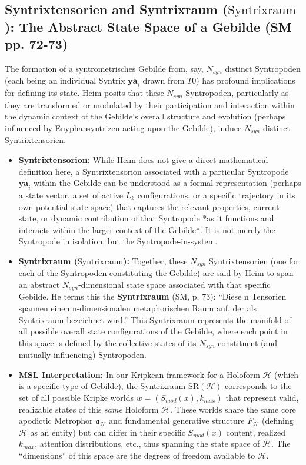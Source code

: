 \documentclass[
    12pt,              %
    a4paper,           %
    headings=normal,   %
    twoside=true,      %
    BCOR=8mm,          %
]{scrbook}
\newcommand{\q}[1]{\enquote{#1}}
\newcommand{\syntrix}{\bm{y\widetilde{a}}}
\newcommand{\syntrixtotalitaet}{T0}
\newcommand{\syntrixraum}{\text{Syntrixraum}}
\begin{document}
\subsection{Syntrixtensorien and Syntrixraum (\(\syntrixraum\)): The Abstract State Space of a Gebilde (SM pp. 72-73)}
\label{sec:ch4_syntrixtensorien_syntrixraum_revised_2} 

The formation of a syntrometrisches Gebilde from, say, \(N_{syn}\) distinct Syntropoden (each being an individual Syntrix \(\syntrix_i\) drawn from \(\syntrixtotalitaet\)) has profound implications for defining its state. Heim posits that these \(N_{syn}\) Syntropoden, particularly as they are transformed or modulated by their participation and interaction within the dynamic context of the Gebilde’s overall structure and evolution (perhaps influenced by Enyphansyntrizen acting upon the Gebilde), induce \(N_{syn}\) distinct Syntrixtensorien.

\begin{itemize}
    \item   \textbf{Syntrixtensorion:} While Heim does not give a direct mathematical definition here, a Syntrixtensorion associated with a particular Syntropode \(\syntrix_i\) within the Gebilde can be understood as a formal representation (perhaps a state vector, a set of active \(L_k\) configurations, or a specific trajectory in its own potential state space) that captures the relevant properties, current state, or dynamic contribution of that Syntropode *as it functions and interacts within the larger context of the Gebilde*. It is not merely the Syntropode in isolation, but the Syntropode-in-system.
    \item   \textbf{Syntrixraum (\(\syntrixraum\)):} Together, these \(N_{syn}\) Syntrixtensorien (one for each of the Syntropoden constituting the Gebilde) are said by Heim to span an abstract \(N_{syn}\)-dimensional state space associated with that specific Gebilde. He terms this the \textbf{Syntrixraum} (SM, p. 73): \q{Diese n Tensorien spannen einen n-dimensionalen metaphorischen Raum auf, der als Syntrixraum bezeichnet wird.} This Syntrixraum represents the manifold of all possible overall state configurations of the Gebilde, where each point in this space is defined by the collective states of its \(N_{syn}\) constituent (and mutually influencing) Syntropoden.
    \item   \textbf{MSL Interpretation:} In our Kripkean framework for a Holoform \(\mathcal{H}\) (which is a specific type of Gebilde), the Syntrixraum \(\text{SR}(\mathcal{H})\) corresponds to the set of all possible Kripke worlds \(w = (S_{mod}(x), k_{max})\) that represent valid, realizable states of this \textit{same} Holoform \(\mathcal{H}\). These worlds share the same core apodictic Metrophor \(\mathfrak{a}_\mathcal{H}\) and fundamental generative structure \(F_\mathcal{H}\) (defining \(\mathcal{H}\) as an entity) but can differ in their specific \(S_{mod}(x)\) content, realized \(k_{max}\), attention distributions, etc., thus spanning the state space of \(\mathcal{H}\). The \q{dimensions} of this space are the degrees of freedom available to \(\mathcal{H}\).
\end{itemize}
\end{document}
